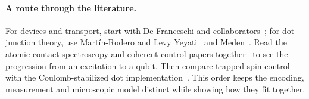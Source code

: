 \paragraph{A route through the literature.}
For devices and transport, start with De Franceschi and
collaborators~\cite{defranceschi2010hybrid}; for dot-junction theory, use
Mart\'in-Rodero and Levy Yeyati~\cite{martinrodero2011josephson} and
Meden~\cite{meden2019andersonjosephson}. Read the atomic-contact spectroscopy
and coherent-control papers together~\cite{bretheau2013exciting,janvier2015coherent}
to see the progression from an excitation to a qubit. Then compare trapped-spin
control~\cite{hays2021coherent} with the Coulomb-stabilized dot
implementation~\cite{pitavidal2023direct}. This order keeps the encoding,
measurement and microscopic model distinct while showing how they fit together.
